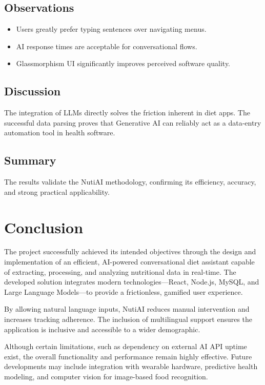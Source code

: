 \documentclass[12pt,a4paper]{report}
\begin{document}
\section{Observations}
\begin{itemize}
    \item Users greatly prefer typing sentences over navigating menus.
    \item AI response times are acceptable for conversational flows.
    \item Glassmorphism UI significantly improves perceived software quality.
\end{itemize}

\section{Discussion}
The integration of LLMs directly solves the friction inherent in diet apps. The successful data parsing proves that Generative AI can reliably act as a data-entry automation tool in health software.

\section{Summary}
The results validate the NutiAI methodology, confirming its efficiency, accuracy, and strong practical applicability.


\chapter{Conclusion}
The project successfully achieved its intended objectives through the design and implementation of an efficient, AI-powered conversational diet assistant capable of extracting, processing, and analyzing nutritional data in real-time. The developed solution integrates modern technologies—React, Node.js, MySQL, and Large Language Models—to provide a frictionless, gamified user experience. 

By allowing natural language inputs, NutiAI reduces manual intervention and increases tracking adherence. The inclusion of multilingual support ensures the application is inclusive and accessible to a wider demographic. 

Although certain limitations, such as dependency on external AI API uptime exist, the overall functionality and performance remain highly effective. Future developments may include integration with wearable hardware, predictive health modeling, and computer vision for image-based food recognition. 
\end{document}
